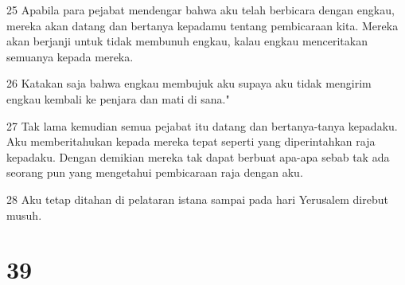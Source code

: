 \par 25 Apabila para pejabat mendengar bahwa aku telah berbicara dengan engkau, mereka akan datang dan bertanya kepadamu tentang pembicaraan kita. Mereka akan berjanji untuk tidak membunuh engkau, kalau engkau menceritakan semuanya kepada mereka.
\par 26 Katakan saja bahwa engkau membujuk aku supaya aku tidak mengirim engkau kembali ke penjara dan mati di sana."
\par 27 Tak lama kemudian semua pejabat itu datang dan bertanya-tanya kepadaku. Aku memberitahukan kepada mereka tepat seperti yang diperintahkan raja kepadaku. Dengan demikian mereka tak dapat berbuat apa-apa sebab tak ada seorang pun yang mengetahui pembicaraan raja dengan aku.
\par 28 Aku tetap ditahan di pelataran istana sampai pada hari Yerusalem direbut musuh.

\chapter{39}

